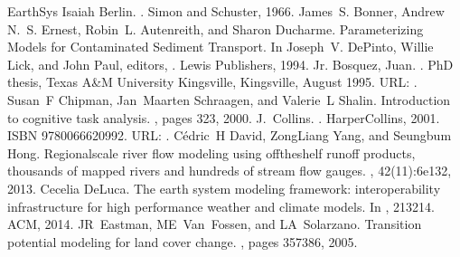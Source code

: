 \documentclass[letterpaper,12pt,english,openany,oneside]{sphinxmanual}
\begin{document}
\begin{sphinxthebibliography}{EarthSys}
\sphinxAtStartPar
Isaiah Berlin. . Simon and Schuster, 1966.
\sphinxAtStartPar
James S. Bonner, Andrew N. S. Ernest, Robin L. Autenreith, and Sharon Ducharme. Parameterizing Models for Contaminated Sediment Transport. In Joseph V. DePinto, Willie Lick, and John Paul, editors, . Lewis Publishers, 1994.
\sphinxAtStartPar
Jr. Bosquez, Juan. . PhD thesis, Texas A\&M University \sphinxhyphen{} Kingsville, Kingsville, August 1995. URL: .
\sphinxAtStartPar
Susan F Chipman, Jan Maarten Schraagen, and Valerie L Shalin. Introduction to cognitive task analysis. , pages 3\textendash{}23, 2000.
\sphinxAtStartPar
J. Collins. . HarperCollins, 2001. ISBN 978\sphinxhyphen{}0\sphinxhyphen{}06\sphinxhyphen{}662099\sphinxhyphen{}2. URL: .
\sphinxAtStartPar
{}
\sphinxAtStartPar
Cédric H David, Zong\sphinxhyphen{}Liang Yang, and Seungbum Hong. Regional\sphinxhyphen{}scale river flow modeling using off\sphinxhyphen{}the\sphinxhyphen{}shelf runoff products, thousands of mapped rivers and hundreds of stream flow gauges. , 42(11):6e132, 2013.
\sphinxAtStartPar
Cecelia DeLuca. The earth system modeling framework: interoperability infrastructure for high performance weather and climate models. In , 213\textendash{}214. ACM, 2014.
\sphinxAtStartPar
JR Eastman, ME Van Fossen, and LA Solarzano. Transition potential modeling for land cover change. , pages 357\textendash{}386, 2005.

\end{sphinxthebibliography}
\end{document}
